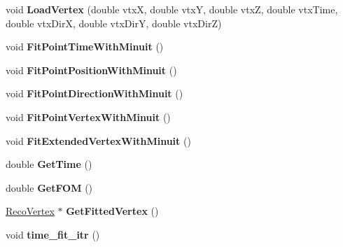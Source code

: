 \begin{DoxyCompactItemize}
\item 
\hypertarget{classMinuitOptimizer_ad3c187d2afcc6e1ee7e82962d162aae8}{void {\bfseries Load\-Vertex} (double vtx\-X, double vtx\-Y, double vtx\-Z, double vtx\-Time, double vtx\-Dir\-X, double vtx\-Dir\-Y, double vtx\-Dir\-Z)}\label{classMinuitOptimizer_ad3c187d2afcc6e1ee7e82962d162aae8}

\item 
\hypertarget{classMinuitOptimizer_ae07d1d7eb8e694627fe0d3310a47ea23}{void {\bfseries Fit\-Point\-Time\-With\-Minuit} ()}\label{classMinuitOptimizer_ae07d1d7eb8e694627fe0d3310a47ea23}

\item 
\hypertarget{classMinuitOptimizer_a3b3a75c840dd6f2c97d5a58da7d5db29}{void {\bfseries Fit\-Point\-Position\-With\-Minuit} ()}\label{classMinuitOptimizer_a3b3a75c840dd6f2c97d5a58da7d5db29}

\item 
\hypertarget{classMinuitOptimizer_a247cd4ed76564b3639f45f5c448f34c4}{void {\bfseries Fit\-Point\-Direction\-With\-Minuit} ()}\label{classMinuitOptimizer_a247cd4ed76564b3639f45f5c448f34c4}

\item 
\hypertarget{classMinuitOptimizer_a655d9ff06d5dce21e2f3506034a1c9a2}{void {\bfseries Fit\-Point\-Vertex\-With\-Minuit} ()}\label{classMinuitOptimizer_a655d9ff06d5dce21e2f3506034a1c9a2}

\item 
\hypertarget{classMinuitOptimizer_a298f53de3f402874b73c2e742b3c16f5}{void {\bfseries Fit\-Extended\-Vertex\-With\-Minuit} ()}\label{classMinuitOptimizer_a298f53de3f402874b73c2e742b3c16f5}

\item 
\hypertarget{classMinuitOptimizer_a067c18d943608f5780dc7313b7978e2a}{double {\bfseries Get\-Time} ()}\label{classMinuitOptimizer_a067c18d943608f5780dc7313b7978e2a}

\item 
\hypertarget{classMinuitOptimizer_a5a764ad18fa653b67d1840d101f76c1e}{double {\bfseries Get\-F\-O\-M} ()}\label{classMinuitOptimizer_a5a764ad18fa653b67d1840d101f76c1e}

\item 
\hypertarget{classMinuitOptimizer_af3094089b0ee9093735d6ed66de01192}{\hyperlink{classRecoVertex}{Reco\-Vertex} $\ast$ {\bfseries Get\-Fitted\-Vertex} ()}\label{classMinuitOptimizer_af3094089b0ee9093735d6ed66de01192}

\item 
\hypertarget{classMinuitOptimizer_a684c745cd0e3150ae223276c3017d150}{void {\bfseries time\-\_\-fit\-\_\-itr} ()}\label{classMinuitOptimizer_a684c745cd0e3150ae223276c3017d150}


\end{DoxyCompactItemize}
